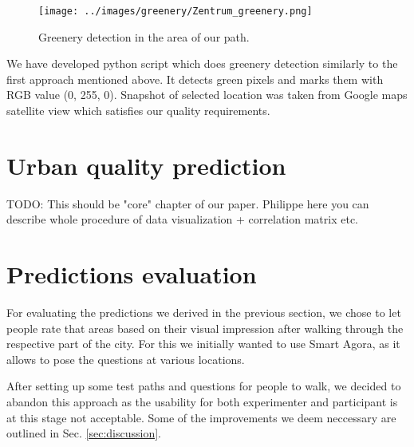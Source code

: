 \documentclass[letterpaper]{article}
\begin{document}
\begin{figure}[htb]
 	\centering
 	\texttt{[image: ../images/greenery/Zentrum\_greenery.png]}
 	\caption{Greenery detection in the area of our path.}
 	\label{fig:path_greenery}
 \end{figure}

\indent We have developed python script which does greenery detection similarly to the first approach mentioned above. It detects green pixels and marks them with RGB value (0, 255, 0). Snapshot of selected location was taken from Google maps satellite view which satisfies our quality requirements.  %

\section{Urban quality prediction}\label{sec:predictions}
TODO: This should be "core" chapter of our paper. Philippe here you can describe whole procedure of data visualization + correlation matrix etc.

\section{Predictions evaluation}\label{sec:exp}
For evaluating the predictions we derived in the previous section, we chose to let people rate that areas based on their visual impression after walking through the respective part of the city. For this we initially wanted to use Smart Agora, as it allows to pose the questions at various locations.

After setting up some test paths and questions for people to walk, we decided to abandon this approach as the usability for both experimenter and participant is at this stage not acceptable. Some of the improvements we deem neccessary are outlined in Sec. \ref{sec:discussion}.
\end{document}
